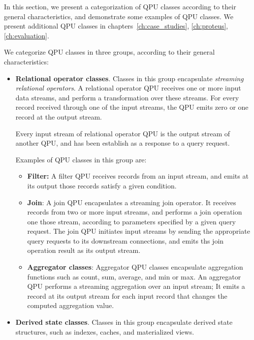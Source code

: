 In this section, we present a categorization of QPU classes according to their general characteristics,
and demonstrate some examples of QPU classes.
We present additional QPU classes in chapters~\ref{ch:case_studies}, \ref{ch:proteus}, \ref{ch:evaluation}.

We categorize QPU classes in three groups, according to their general characteristics:
\begin{itemize}
  \item \textbf{Relational operator classes}.
  Classes in this group encapsulate \textit{streaming relational operators}.
  A relational operator QPU receives one or more input data streams, and perform a transformation over these streams.
  For every record received through one of the input streams, the QPU emits zero or one record at the output stream.

  Every input stream of relational operator QPU is the output stream of another QPU, and has been establish as a response
  to a query request.

  Examples of QPU classes in this group are:
  \begin{itemize}
    \item \textbf{Filter:}
    A filter QPU receives records from an input stream, and  emits at its output those records satisfy a given condition.

    \item \textbf{Join}:
    A join QPU encapsulates a streaming join operator.
    It receives records from two or more input streams, and performs a join operation one those stream, according
    to parameters specified by a given query request.
    The join QPU initiates input streams by sending the appropriate query requests to its downstream connections,
    and emits ths join operation result as its output stream.

    \item \textbf{Aggregator classes}:
    Aggregator QPU classes encapsulate aggregation functions such as count, sum, average, and min or max.
    An aggregator QPU performs a streaming aggregation over an input stream;
    It emits a record at its output stream for each input record that changes the computed aggregation value.
  \end{itemize}

  \item \textbf{Derived state classes}.
  Classes in this group encapsulate derived state structures, such as indexes, caches, and materialized views.


\end{itemize}
